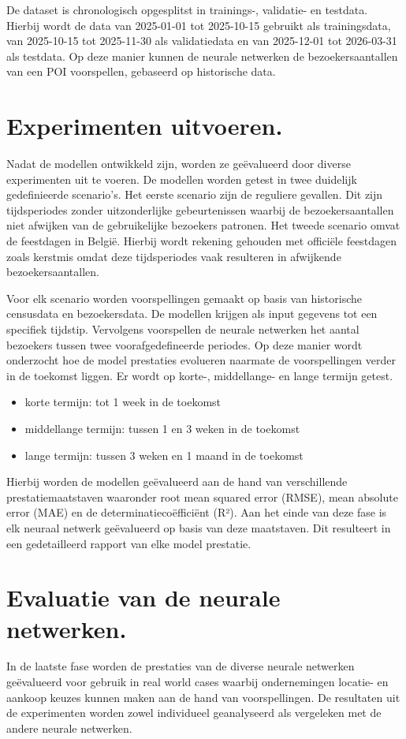 De dataset is chronologisch opgesplitst in trainings-, validatie- en testdata. Hierbij wordt de data van 2025-01-01 tot 2025-10-15 gebruikt als trainingsdata, van 2025-10-15 tot 2025-11-30 als validatiedata en van 2025-12-01 tot 2026-03-31 als testdata. Op deze manier kunnen de neurale netwerken de bezoekersaantallen van een POI voorspellen, gebaseerd op historische data.

\section{Experimenten uitvoeren.}
Nadat de modellen ontwikkeld zijn, worden ze geëvalueerd door diverse experimenten uit te voeren. De modellen worden getest in twee duidelijk gedefinieerde scenario's. Het eerste scenario zijn de reguliere gevallen. Dit zijn tijdsperiodes zonder uitzonderlijke gebeurtenissen waarbij de bezoekersaantallen niet afwijken van de gebruikelijke bezoekers patronen. Het tweede scenario omvat de feestdagen in België. Hierbij wordt rekening gehouden met officiële feestdagen zoals kerstmis omdat deze tijdsperiodes vaak resulteren in afwijkende bezoekersaantallen.

Voor elk scenario worden voorspellingen gemaakt op basis van historische censusdata en bezoekersdata. De modellen krijgen als input gegevens tot een specifiek tijdstip. Vervolgens voorspellen de neurale netwerken het aantal bezoekers tussen twee voorafgedefineerde periodes. Op deze manier wordt onderzocht hoe de model prestaties evolueren naarmate de voorspellingen verder in de toekomst liggen. Er wordt op korte-, middellange- en lange termijn getest.

\begin{itemize}
    \item korte termijn: tot 1 week in de toekomst
    \item middellange termijn: tussen 1 en 3 weken in de toekomst
    \item lange termijn: tussen 3 weken en 1 maand in de toekomst
\end{itemize}

Hierbij worden de modellen geëvalueerd aan de hand van verschillende prestatiemaatstaven waaronder root mean squared error (RMSE), mean absolute error (MAE) en de determinatiecoëfficiënt (R²). Aan het einde van deze fase is elk neuraal netwerk geëvalueerd op basis van deze maatstaven. Dit resulteert in een gedetailleerd rapport van elke model prestatie.

\section{Evaluatie van de neurale netwerken.}
In de laatste fase worden de prestaties van de diverse neurale netwerken geëvalueerd voor gebruik in real world cases waarbij ondernemingen locatie- en aankoop keuzes kunnen maken aan de hand van voorspellingen. De resultaten uit de experimenten worden zowel individueel geanalyseerd als vergeleken met de andere neurale netwerken. 

